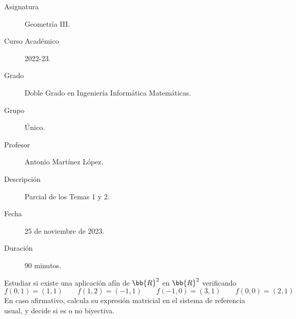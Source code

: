 \documentclass[12pt]{article}
\begin{document}

    
    

    \begin{description}
        \item[Asignatura] Geometría III.
        \item[Curso Académico] 2022-23.
        \item[Grado] Doble Grado en Ingeniería Informática Matemáticas.
        \item[Grupo] Único.
        \item[Profesor] Antonio Martínez López.
        \item[Descripción] Parcial de los Temas 1 y 2.
        \item[Fecha] 25 de noviembre de 2023.
        \item[Duración] 90 minutos.
    
    \end{description}
    \newpage
    
    \begin{ejercicio}[4 puntos]
        Estudiar si existe una aplicación afín de $\bb{R}^2$ en $\bb{R}^2$ verificando
        \begin{equation*}
            f(0,1)=(1,1) \qquad f(1,2)=(-1,1) \qquad f(-1,0)=(3,1) \qquad f(0,0)=(2,1)
        \end{equation*}
        En caso afirmativo, calcula su expresión matricial en el sistema de referencia usual, y decide si es o no biyectiva.
    \end{ejercicio}
\end{document}
